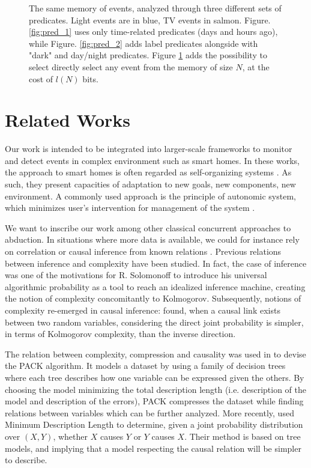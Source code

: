 \documentclass[entropy,article,submit,moreauthors,pdftex]{Definitions/mdpi}
\begin{document}
\begin{figure}[H]
\begin{subfigure}{\linewidth}
        \caption{}
        \label{fig:pred_3}
    \end{subfigure}
    \caption{The same memory of events, analyzed through three different sets of predicates. Light events are in blue, TV events in salmon. Figure. \ref{fig:pred_1} uses only time-related predicates (days and hours ago), while Figure. \ref{fig:pred_2} adds label predicates alongside with "dark" and day/night predicates. Figure \ref{fig:pred_3} adds the possibility to select directly select any event from the memory of size $N$, at the cost of $l(N)$ bits.}
    \label{fig:3preds}
\end{figure}

\section{Related Works}
\label{sec:related}
Our work is intended to be integrated into larger-scale frameworks to monitor
and detect events in complex environment such as smart homes. In these works, the
approach to smart homes is often regarded as self-organizing systems \cite{kramer_rigorous_2009,kounev_notion_2017}. As such, they present capacities of adaptation to new goals,
new components, new environment. A commonly used approach is the principle of
autonomic system, which minimizes user's intervention for management of the
system \cite{kounev_notion_2017,kephart_vision_2003}.

We want to inscribe our work among other classical concurrent approaches to
abduction. In situations where more data is available, we could for instance rely
on correlation or causal inference from known relations \cite{peters_elements_2017,fadiga_or_2021}.
Previous relations between inference and complexity have been studied. In fact, the
case of inference was one of the motivations for R. Solomonoff to introduce his
universal algorithmic probability \cite{solomonoff_formal_1964} as a tool to
reach an idealized inference machine, creating the notion of complexity concomitantly
to Kolmogorov. Subsequently, notions of complexity re-emerged in causal inference:
\cite{janzing_causal_2010} found, when a causal link exists between two random variables,
considering the direct joint probability is simpler, in terms of Kolmogorov complexity,
than the inverse direction.

The relation between complexity, compression and causality was used in \cite{tatti_finding_2008} to devise the PACK algorithm. It models a dataset by using a family of decision trees where each tree describes how one variable can be expressed given the others. By choosing the model minimizing the total description length (i.e. description of the model and description of the errors), PACK compresses the dataset while finding relations between variables which can be further analyzed. More recently, \cite{marx_causal_2018} used Minimum Description Length to determine, given a joint probability distribution over $(X,Y)$, whether $X$ causes $Y$ or $Y$ causes $X$. Their method is based on tree models, and implying that a model respecting the causal relation will be simpler to describe.
\end{document}
